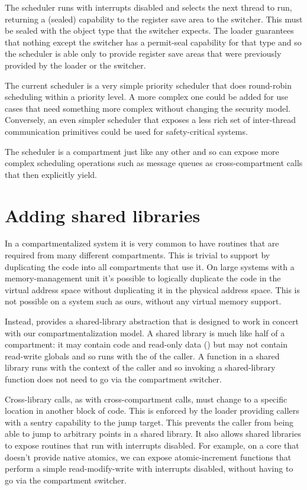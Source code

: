 The scheduler runs with interrupts disabled and selects the next thread to run, returning a (sealed) capability to the register save area to the switcher.
This must be sealed with the object type that the switcher expects.
The loader guarantees that nothing except the switcher has a permit-seal capability for that type and so the scheduler is able only to provide register save areas that were previously provided by the loader or the switcher.

The current \cherimcuos{} scheduler is a very simple priority scheduler that does round-robin scheduling within a priority level.
A more complex one could be added for use cases that need something more complex without changing the security model.
Conversely, an even simpler scheduler that exposes a less rich set of inter-thread communication primitives could be used for safety-critical systems.

The scheduler is a compartment just like any other and so can expose more complex scheduling operations such as message queues as cross-compartment calls that then explicitly yield.

\section{Adding shared libraries}

In a compartmentalized system it is very common to have routines that are required from many different compartments.
This is trivial to support by duplicating the code into all compartments that use it.
On large systems with a memory-management unit it's possible to logically duplicate the code in the virtual address space without duplicating it in the physical address space.
This is not possible on a system such as ours, without any virtual memory support.

Instead, \cherimcuos{} provides a shared-library abstraction that is designed to work in concert with our compartmentalization model.
A shared library is much like half of a compartment: it may contain code and read-only data (\PCC) but may not contain read-write globals and so runs with the \CGP{} of the caller.
A function in a shared library runs with the context of the caller and so invoking a shared-library function does not need to go via the compartment switcher.

Cross-library calls, as with cross-compartment calls, must change \PCC{} to a specific location in another block of code.
This is enforced by the loader providing callers with a sentry capability to the jump target.
This prevents the caller from being able to jump to arbitrary points in a shared library.
It also allows shared libraries to expose routines that run with interrupts disabled.
For example, on a core that doesn't provide native atomics, we can expose atomic-increment functions that perform a simple read-modify-write with interrupts disabled, without having to go via the compartment switcher.


